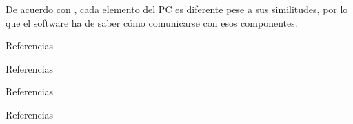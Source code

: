 \begin{frame}
    De acuerdo con \textcite{montaje}, cada elemento del PC es
    diferente pese a sus similitudes, por lo que el software ha
    de saber cómo comunicarse con esos componentes.
\end{frame}
\begin{frame}{Referencias}
    \printbibliography[keyword=one]
\end{frame}
\begin{frame}{Referencias}
    \printbibliography[keyword=two]
\end{frame}
\begin{frame}{Referencias}
    \printbibliography[keyword=three]
\end{frame}
\begin{frame}{Referencias}
    \printbibliography[keyword=four]
\end{frame}